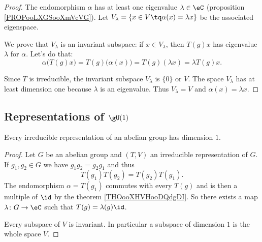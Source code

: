 \begin{proof}
    The endomorphism \( \alpha\) has at least one eigenvalue \( \lambda\in \eC\) (proposition \ref{PROPooLXGSooXmVcVG}). Let \( V_{\lambda}=\{ x\in V\tq \alpha(x)=\lambda x \}\) be the associated eigenspace.

    We prove that \( V_{\lambda}\) is an invariant subspace: if \( x\in V_{\lambda}\), then \( T(g)x\) has eigenvalue \( \lambda\) for \( \alpha\). Let's do that:
    \begin{equation}
        \alpha\big( T(g)x \big)=T(g)\big( \alpha(x) \big)=T(g)(\lambda x)=\lambda T(g)x.
    \end{equation}
    
    Since \( T\) is irreducible, the invariant subspace \( V_{\lambda}\) is \( \{ 0 \}\) or \( V\). The space \( V_{\lambda}\) has at least dimension one because \( \lambda\) is an eigenvalue. Thus \( V_{\lambda}=V\) and \( \alpha(x)=\lambda x\).
\end{proof}

\subsection{Representations of \( \gU(1)\)}

\begin{theorem}       \label{THOooFFJGooCekFQc}
    Every irreducible representation of an abelian group has dimension \( 1\).
\end{theorem}

\begin{proof}
    Let \( G\) be an abelian group and \( (T,V)\) an irreducible representation of \( G\). If \( g_1,g_2\in G\) we have \( g_1g_2=g_2g_1\) and thus
    \begin{equation}
        T(g_1)T(g_2)=T(g_2)T(g_1).
    \end{equation}
    The endomorphism \( \alpha=T(g_1)\) commutes with every \( T(g)\) and is then a multiple of \( \id\) by the theorem \ref{THOooXHVHooDQdgDI}. So there exists a map \( \lambda\colon G\to \eC\) such that \( T(g)=\lambda(g)\id\).

    Every subspace of \( V\) is invariant. In particular a subspace of dimension \( 1\) is the whole space \( V\).
\end{proof}


